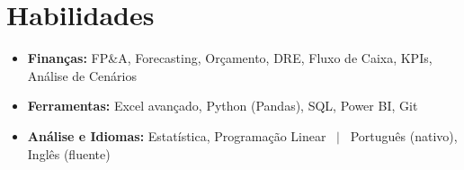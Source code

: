 \section{Habilidades}
\begin{itemize}[leftmargin=0.15in, label={}, itemsep=-3pt, topsep=2pt]
  \item \small{\textbf{Finanças:} FP\&A, Forecasting, Orçamento, DRE, Fluxo de Caixa, KPIs, Análise de Cenários}
  \item \small{\textbf{Ferramentas:} Excel avançado, Python (Pandas), SQL, Power BI, Git}
  \item \small{\textbf{Análise e Idiomas:} Estatística, Programação Linear \, $|$ \, Português (nativo), Inglês (fluente)}
\end{itemize}

